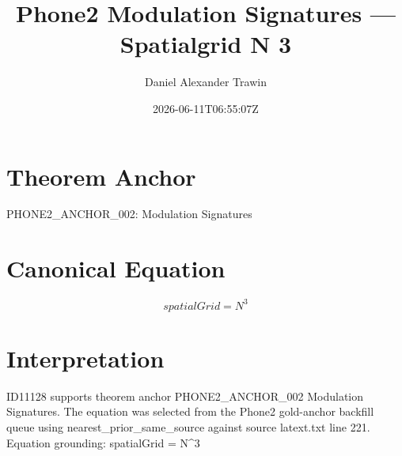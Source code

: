 \documentclass[11pt]{article}
\title{Phone2 Modulation Signatures — Spatialgrid N 3}
\author{Daniel Alexander Trawin}
\date{2026-06-11T06:55:07Z}
\begin{document}
\maketitle
\section*{Theorem Anchor}
PHONE2_ANCHOR_002: Modulation Signatures
\section*{Canonical Equation}
\[
spatialGrid = N^3
\]
\section*{Interpretation}
ID11128 supports theorem anchor PHONE2_ANCHOR_002 Modulation Signatures. The equation was selected from the Phone2 gold-anchor backfill queue using nearest_prior_same_source against source latext.txt line 221. Equation grounding: spatialGrid = N^3
\end{document}
